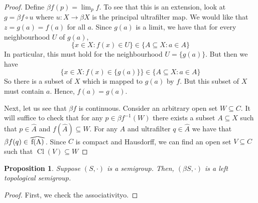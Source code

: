 \documentclass[11pt,letterpaper]{article}
\newtheorem{prop}{Proposition}
\newcommand{\inv}{^{-1}}
\newcommand{\parens}[1]{\left(#1\right)}
\DeclareMathOperator{\closureOp}{Cl}
\newcommand{\closure}[1]{\closureOp{\parens{#1}}}
\newcommand{\compose}{\circ}
\newcommand\reallywidehat[1]{%
\savestack{\tmpbox}{\stretchto{%
  \scaleto{%
    \scalerel*[\widthof{\ensuremath{#1}}]{\kern-.6pt\bigwedge\kern-.6pt}%
    {\rule[-\textheight/2]{1ex}{\textheight}}%
  }{\textheight}%
}{0.5ex}}%
\stackon[1pt]{#1}{\tmpbox}%
}
\begin{document}
\begin{proof}
    Define $\beta f (p) = \lim_p f$. To see that this is an extension, look at
    $g = \beta f \compose u$ where $u : X \to \beta X$ is the principal
    ultrafilter map. We would like that $z = g(a) = f(a)$ for all $a$.
    Since $g(a)$ is a limit, we have that for every neighbourhood $U$ of
    $g(a)$,
    \begin{equation*}
        \{x \in X : f(x) \in U \} \in \{ A \subseteq X : a \in A \}
    \end{equation*}
    In particular, this must hold for the neighbourhood $U = \{g(a)\}$.
    But then we have
    \begin{equation*}
        \{x \in X : f(x) \in \{g(a)\}\} \in \{A \subseteq X : a \in A \}
    \end{equation*}
    So there is a subset of $X$ which is mapped to $g(a)$ by $f$. But this
    subset of $X$ must contain $a$. Hence, $f(a) = g(a)$.

    Next, let us see that $\beta f$ is continuous.
    Consider an arbitrary open set $W \subseteq C$.
    It will suffice to check that for any $p \in \beta f\inv (W)$ there exists a
    subset $A \subseteq X$ such that
    $p \in \hat A$ and $f(\hat A) \subseteq W$.
    For any $A$ and ultrafilter $q \in \hat A$ we have that
    $\beta f (q) \in \reallywidehat {f(A)}$.
    Since $C$ is compact and Hausdorff, we can find an open set $V \subseteq C$
    such that $\closure{V} \subseteq W$
\end{proof}

\begin{prop}
    Suppose $(S, \cdot)$ is a semigroup. Then, $(\beta S, \cdot)$ is a left
    topological semigroup.
\end{prop}

\begin{proof}
    First, we check the associativityo.
\end{proof}
\end{document}
